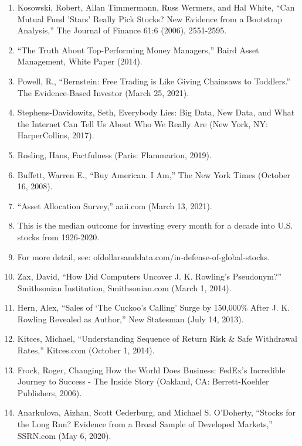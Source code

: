 \begin{enumerate}
\item\hypertarget{endnote:81}{} Kosowski, Robert, Allan Timmermann, Russ Wermers, and Hal White, “Can Mutual Fund 'Stars' Really Pick Stocks? New Evidence from a Bootstrap Analysis,” The Journal of Finance 61:6 (2006), 2551-2595.
\item\hypertarget{endnote:82}{} “The Truth About Top-Performing Money Managers,” Baird Asset Management, White Paper (2014).
\item\hypertarget{endnote:83}{} Powell, R., “Bernstein: Free Trading is Like Giving Chainsaws to Toddlers.” The Evidence-Based Investor (March 25, 2021).
\item\hypertarget{endnote:84}{} Stephens-Davidowitz, Seth, Everybody Lies: Big Data, New Data, and What the Internet Can Tell Us About Who We Really Are (New York, NY: HarperCollins, 2017).
\item\hypertarget{endnote:85}{} Rosling, Hans, Factfulness (Paris: Flammarion, 2019).
\item\hypertarget{endnote:86}{} Buffett, Warren E., “Buy American. I Am,” The New York Times (October 16, 2008).
\item\hypertarget{endnote:87}{} “Asset Allocation Survey,” aaii.com (March 13, 2021).
\item\hypertarget{endnote:88}{} This is the median outcome for investing every month for a decade into U.S. stocks from 1926-2020.
\item\hypertarget{endnote:89}{} For more detail, see: ofdollarsanddata.com/in-defense-of-global-stocks.
\item\hypertarget{endnote:90}{} Zax, David, “How Did Computers Uncover J. K. Rowling’s Pseudonym?” Smithsonian Institution, Smithsonian.com (March 1, 2014).
\item\hypertarget{endnote:91}{} Hern, Alex, “Sales of ‘The Cuckoo’s Calling’ Surge by 150,000\% After J. K. Rowling Revealed as Author,” New Statesman (July 14, 2013).
\item\hypertarget{endnote:92}{} Kitces, Michael, “Understanding Sequence of Return Risk \& Safe Withdrawal Rates,” Kitces.com (October 1, 2014).
\item\hypertarget{endnote:93}{} Frock, Roger, Changing How the World Does Business: FedEx's Incredible Journey to Success - The Inside Story (Oakland, CA: Berrett-Koehler Publishers, 2006).
\item\hypertarget{endnote:94}{} Anarkulova, Aizhan, Scott Cederburg, and Michael S. O’Doherty, “Stocks for the Long Run? Evidence from a Broad Sample of Developed Markets,” SSRN.com (May 6, 2020).

\end{enumerate}
